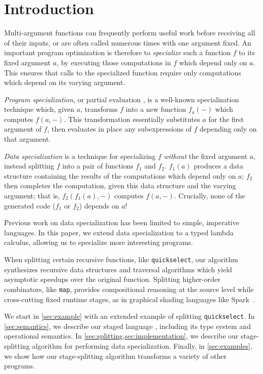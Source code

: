 \section{Introduction}

Multi-argument functions can frequently perform useful work before receiving all
of their inputs, or are often called numerous times with one argument fixed. An
important program optimization is therefore to \emph{specialize} such a function
$f$ to its fixed argument $a$, by executing those computations in $f$ which
depend only on $a$. This ensures that calls to the specialized function require
only computations which depend on its varying argument.

\emph{Program specialization}, or partial evaluation \cite{futamura71,jones96},
is a well-known specialization technique which, given $a$, transforms $f$ into a
new function $f_a(-)$ which computes $f(a,-)$. This transformation essentially
substitutes $a$ for the first argument of $f$, then evaluates in place any
subexpressions of $f$ depending only on that argument.

\emph{Data specialization} \cite{knoblock96,JS86-staging} 
is a technique for specializing $f$ \emph{without} the fixed argument $a$,
instead splitting $f$ into a pair of functions $f_1$ and $f_2$. $f_1(a)$
produces a data structure containing the results of the computations which
depend only on $a$; $f_2$ then completes the computation, given this data
structure and the varying argument; that is, $f_2(f_1(a),-)$ computes $f(a,-)$.
Crucially, none of the generated code ($f_1$ or $f_2$) depends on $a$!

Previous work on data specialization has been limited to simple, imperative
languages. In this paper, we extend data specialization to a typed lambda
calculus, allowing us to specialize more interesting programs.

When splitting certain recursive functions, like \texttt{quickselect}, our
algorithm synthesizes recursive data structures and traversal algorithms which
yield asymptotic speedups over the original function. Splitting higher-order
combinators, like \texttt{map}, provides compositional reasoning at the source
level while cross-cutting fixed runtime stages, as in graphical shading
languages like Spark~\cite{Foley:2011}.

We start in \ref{sec:example} with an extended example of splitting
\texttt{quickselect}.
In \ref{sec:semantics}, we describe our staged language \lang, including its
type system and operational semantics.
In \ref{sec:splitting,sec:implementation}, we describe our stage-splitting
algorithm for performing data specialization.
Finally, in \ref{sec:examples}, we show how our stage-splitting algorithm
transforms a variety of other programs.
